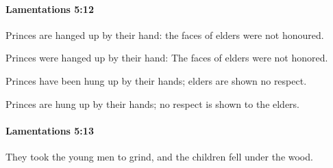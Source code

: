 		\paragraph{Lamentations 5:12} %
			\label{LAMENTATIONS-5-12}

			Princes are hanged up by their hand: the faces of elders were not honoured.

			\begin{versebox}
					\item[BHS] 
					\item[LXX] 
					\item[ASV] Princes were hanged up by their hand: The faces of elders were not honored.
					\item[NIV] Princes have been hung up by their hands; elders are shown no respect.
					\item[NRSV] Princes are hung up by their hands; no respect is shown to the elders.
			\end{versebox}

		\paragraph{Lamentations 5:13} %
			\label{LAMENTATIONS-5-13}

			They took the young men to grind, and the children fell under the wood.

